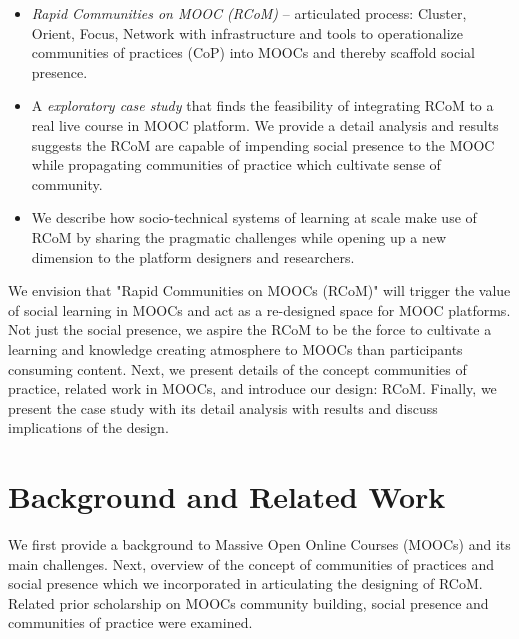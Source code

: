 \documentclass[format=acmsmall, review=false, screen=true]{acmart}
\begin{document}
\begin{itemize}
\item \textit{Rapid Communities on MOOC (RCoM)} -- articulated process: Cluster, Orient, Focus, Network with infrastructure and tools to operationalize communities of practices (CoP) into MOOCs and thereby scaffold social presence. 
\item A \textit{exploratory case study} that finds the feasibility of integrating RCoM to a real live course in MOOC platform. We provide a detail analysis and results suggests the RCoM are capable of impending social presence to the MOOC while propagating communities of practice which cultivate sense of community.
\item We describe how socio-technical systems of learning at scale make use of RCoM by sharing the pragmatic challenges while opening up a new dimension to the platform designers and researchers. 
\end{itemize}

We envision that "Rapid Communities on MOOCs (RCoM)" will trigger the value of social learning in MOOCs and act as a re-designed space for MOOC platforms. Not just the social presence, we aspire the RCoM to be the force to cultivate a learning and knowledge creating atmosphere to MOOCs than participants consuming content. Next, we present details of the concept communities of practice, related work in MOOCs, and introduce our design: RCoM. Finally, we present the case study with its detail analysis with results and discuss implications of the design.

\section{Background and Related Work}
We first provide a background to Massive Open Online Courses (MOOCs) and its main challenges. Next, overview of the concept of communities of practices and social presence which we incorporated in articulating the designing of RCoM. Related prior scholarship on MOOCs community building, social presence and communities of practice were examined. 
\end{document}
